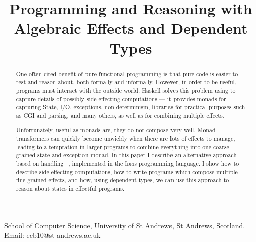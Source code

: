 \documentclass[preprint]{sigplanconf}
\newcounter{per}
\newcommand{\Idris}{\textsc{Idris}}
\begin{document}
\title{Programming and Reasoning with Algebraic Effects and Dependent Types}
{School of Computer Science, 
University of St Andrews, St Andrews, Scotland.}
{Email: ecb10@st-andrews.ac.uk}

\maketitle

\begin{abstract}
One often cited benefit of pure functional programming is that pure code is
easier to test and reason about, both formally and informally. However, in
order to be useful, programs must interact with the outside world.
Haskell solves this problem using  to capture
details of possibly side effecting computations --- it provides monads for
capturing State, I/O, exceptions, non-determinism, libraries for practical
purposes such as CGI and parsing, and many others, as well as  for combining multiple effects.

Unfortunately, useful as monads are, they do not compose very well. Monad
transformers can quickly become unwieldy when there are lots of effects to
manage, leading to a temptation in larger programs to combine everything into
one coarse-grained state and exception monad. In this paper I describe an
alternative approach based on handling ~, implemented
in the \Idris{} programming language. I show how to describe side effecting
computations, how to write programs which compose multiple fine-grained
effects, and how, using dependent types, we can use this approach to reason
about states in effectful programs.
\end{abstract}




%

%

%












\begin{small}


\appendix
%

\end{small}
\end{document}

